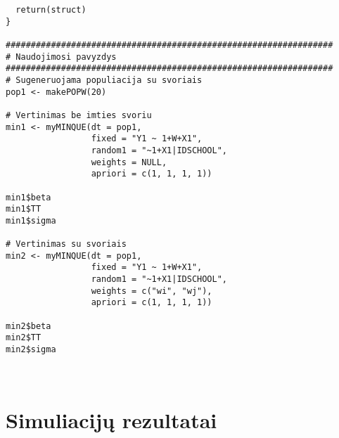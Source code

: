 \documentclass[12pt,a4paper]{article}
\begin{document}
\begin{appendix}
\begin{footnotesize}
\begin{verbatim}
  return(struct)
}

#################################################################
# Naudojimosi pavyzdys
#################################################################
# Sugeneruojama populiacija su svoriais
pop1 <- makePOPW(20)

# Vertinimas be imties svoriu
min1 <- myMINQUE(dt = pop1,
                 fixed = "Y1 ~ 1+W+X1",
                 random1 = "~1+X1|IDSCHOOL",
                 weights = NULL,
                 apriori = c(1, 1, 1, 1))

min1$beta
min1$TT
min1$sigma

# Vertinimas su svoriais
min2 <- myMINQUE(dt = pop1,
                 fixed = "Y1 ~ 1+W+X1",
                 random1 = "~1+X1|IDSCHOOL",
                 weights = c("wi", "wj"),
                 apriori = c(1, 1, 1, 1))

min2$beta
min2$TT
min2$sigma



\end{verbatim}
\end{footnotesize}
\end{appendix}


\newpage
\section{Simuliacijų rezultatai}\label{sec:lenteles}
\end{document}
